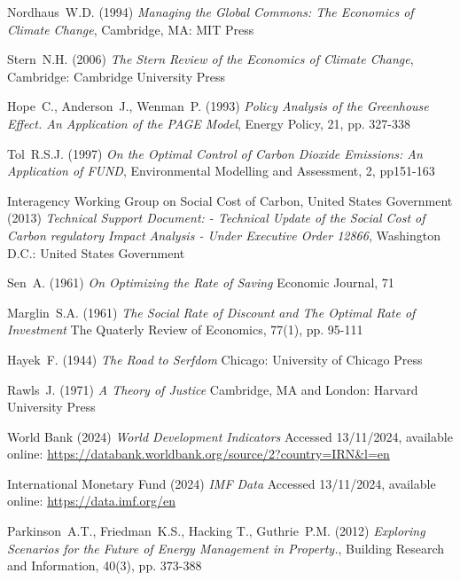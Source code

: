 \documentclass[12pt, oneside]{article}   	%
\begin{document}
\begin{thebibliography}{99}
 Nordhaus~W.D. (1994)
\emph{Managing the Global Commons: The Economics of Climate Change},
Cambridge, MA: MIT Press
	
 Stern~N.H. (2006)
\emph{The Stern Review of the Economics of Climate Change},
Cambridge: Cambridge University Press
		
 Hope~C., Anderson~J., Wenman~P. (1993)
\emph{Policy Analysis of the Greenhouse Effect. An Application of the PAGE Model},
Energy Policy, 21, pp. 327-338
		
 Tol~R.S.J. (1997)
\emph{On the Optimal Control of Carbon Dioxide Emissions: An Application of FUND},
Environmental Modelling and Assessment, 2, pp151-163

 Interagency Working Group on Social Cost of Carbon, United States Government (2013)
\emph{Technical Support Document: - Technical Update of the Social Cost of Carbon regulatory Impact Analysis - Under Executive Order 12866},
Washington D.C.: United States Government

 Sen~A. (1961)
\emph{On Optimizing the Rate of Saving}
Economic Journal, 71
		
 Marglin~S.A. (1961)
\emph{The Social Rate of Discount and The Optimal Rate of Investment}
The Quaterly Review of Economics, 77(1), pp. 95-111

 Hayek~F. (1944)
\emph{The Road to Serfdom}
Chicago: University of Chicago Press

 Rawls~J. (1971)
\emph{A Theory of Justice}
Cambridge, MA and London: Harvard University Press

 World Bank (2024)
\emph{World Development Indicators}
Accessed 13/11/2024, available online: 
\url{https://databank.worldbank.org/source/2?country=IRN&l=en}

 International Monetary Fund (2024)
\emph{IMF Data}
Accessed 13/11/2024, available online: 
\url{https://data.imf.org/en}

 Parkinson~A.T., Friedman~K.S., Hacking T., Guthrie~P.M. (2012)
\emph{Exploring Scenarios for the Future of Energy Management in Property.},
Building Research and Information, 40(3), pp. 373-388
	
\end{thebibliography}
\end{document}
